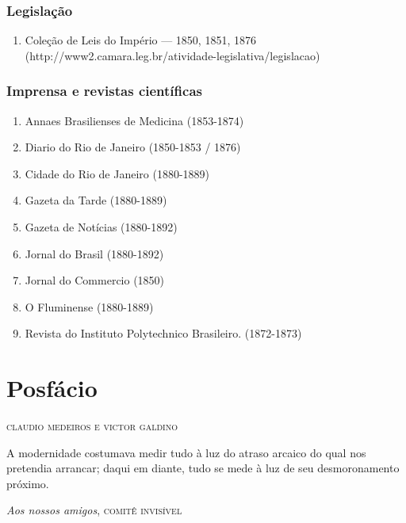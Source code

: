 \subsection*{Legislação}\label{legislauxe7uxe3o}

\begin{enumerate}
\def\labelenumi{\arabic{enumi}.}
\tightlist
\item
  Coleção de Leis do Império --- 1850, 1851, 1876
  (http://www2.camara.leg.br/atividade-legislativa/legislacao)
\end{enumerate}

\subsection*{Imprensa e revistas
científicas}\label{imprensa-e-revistas-cientuxedficas}

\begin{enumerate}
\def\labelenumi{\arabic{enumi}.}
\item
  Annaes Brasilienses de Medicina (1853-1874)
\item
  Diario do Rio de Janeiro (1850-1853 / 1876)
\item
  Cidade do Rio de Janeiro (1880-1889)
\item
  Gazeta da Tarde (1880-1889)
\item
  Gazeta de Notícias (1880-1892)
\item
  Jornal do Brasil (1880-1892)
\item
  Jornal do Commercio (1850)
\item
  O Fluminense (1880-1889)
\item
  Revista do Instituto Polytechnico Brasileiro. (1872-1873)
\end{enumerate}

\chapter[Posfácio]{Posfácio }

\begin{flushright}
\textsc{claudio medeiros e victor galdino}
\end{flushright}

\epigraph{A modernidade costumava medir tudo à luz do atraso arcaico do qual 
nos pretendia arrancar; daqui em diante, tudo se mede à luz de seu desmoronamento próximo.}{\textit{Aos nossos amigos}, \textsc{comitê invisível}}

